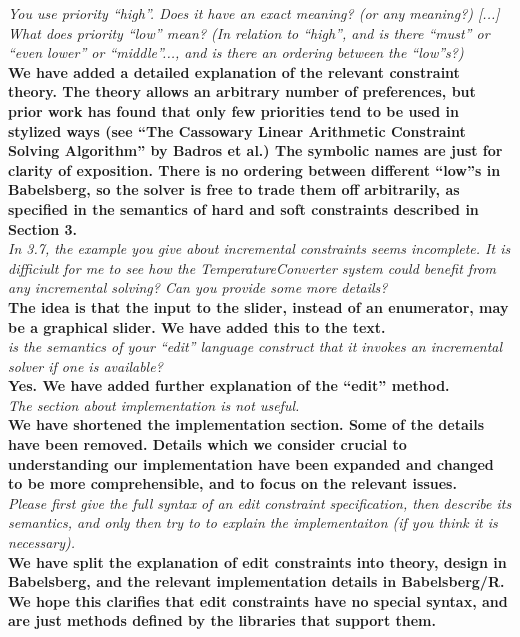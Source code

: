 \documentclass[english]{article}
\begin{document}
\textit{You use priority ``high''. Does it have an exact meaning? (or
  any meaning?) [...] What does priority ``low'' mean?  (In relation
  to ``high'', and is there ``must'' or ``even lower'' or
  ``middle''..., and is
  there an ordering between the ``low''s?)}\\
\textbf{We have added a detailed explanation of the relevant
  constraint theory. The theory allows an arbitrary number of
  preferences, but prior work has found that only few priorities tend
  to be used in stylized ways (see ``The Cassowary Linear Arithmetic
  Constraint Solving Algorithm'' by Badros et al.) The symbolic names
  are just for clarity of exposition. There is no ordering between different
  ``low''s in Babelsberg, so the
  solver is free to trade them off arbitrarily, as specified in the
  semantics of hard and soft constraints described in Section 3.}\\

\textit{In 3.7, the example you give about incremental constraints
  seems incomplete.  It is difficiult for me to see how the
  TemperatureConverter system could benefit from any incremental
  solving? Can you provide some more details?}\\
\textbf{The idea is that the input to the slider, instead of an
  enumerator, may be a graphical slider. We have added this to the
  text.}\\

\textit{is the semantics of your ``edit'' language construct that it
  invokes an incremental solver if one is available? }\\
\textbf{Yes. We have added further explanation of the ``edit'' method.}\\

\textit{The section about implementation is not useful.}\\
\textbf{We have shortened the implementation section. Some of the
  details have been removed. Details which we consider crucial to
  understanding our implementation have been expanded and changed to
  be more comprehensible, and to focus on the relevant issues.}\\

\textit{Please first give the full syntax of an edit constraint
  specification, then describe its semantics, and only then try to to
  explain the implementaiton (if you think it is necessary).}\\
\textbf{We have split the explanation of edit constraints into theory,
  design in Babelsberg, and the relevant implementation details in
  Babelsberg/R. We hope this clarifies that edit constraints have no
  special syntax, and are just methods defined by the libraries that
  support them.}\\
\end{document}
